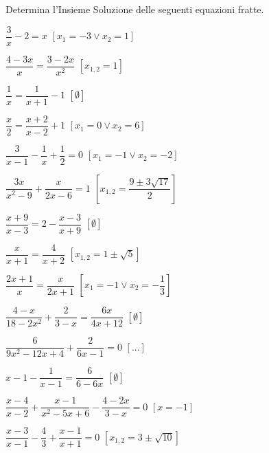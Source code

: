 
\begin{esercizio}[\Ast]
\label{ese:3.39}
Determina l'Insieme Soluzione delle seguenti equazioni fratte.
\begin{multicols}{2}
\begin{enumeratea}
\item\(\dfrac{3}{x}-2 = x\)
  \hfill\(\left[x_{1} =-3 \vee x_{2} = 1\right]\)
\item\(\dfrac{4-3 x}{x}=\dfrac{3-2 x}{x^{2}}\)
  \hfill\(\left[x_{1,2}= 1\right]\)
\item\(\dfrac{1}{x} = \dfrac{1}{x + 1}-1\)
  \hfill\(\left[\emptyset\right]\)
\item\(\dfrac{x}{2} = \dfrac{x + 2}{x-2} + 1\)
  \hfill\(\left[x_{1} = 0 \vee x_{2} = 6\right]\)
\item\(\dfrac{3}{x-1}-\dfrac{1}{x} + \dfrac{1}{2} = 0\)
  \hfill\(\left[x_{1} =-1 \vee x_{2} =-2\right]\)
\item\(\dfrac{3 x}{x^{2}-9} + \dfrac{x}{2 x-6}=1\)
  \hfill\(\left[x_{1,2} = \dfrac{9 \pm 3 \sqrt{17}}{2}\right]\)
\item\(\dfrac{x + 9}{x-3}=2-\dfrac{x-3}{x + 9}\)
  \hfill\(\left[\emptyset\right]\)
\item\(\dfrac{x}{x + 1} = \dfrac{4}{x + 2}\)
  \hfill\(\left[x_{1,2} = 1 \pm \sqrt{5}\right]\)
\item\(\dfrac{2 x + 1}{x} = \dfrac{x}{2 x + 1}\)
  \hfill\(\left[x_{1} =-1 \vee x_{2} =-\dfrac{1}{3}\right]\)
\item\(\dfrac{4-x}{18-2 x^{2}} + \dfrac{2}{3-x} = \dfrac{6 x}{4 x +12}\)
  \hfill\(\left[\emptyset\right]\)
\item\(\dfrac{6}{9 x^{2}-12 x + 4} + \dfrac{2}{6x -1} =0\)
  \hfill\(\left[...\right]\)
\item\(x-1-\dfrac{1}{x-1} = \dfrac{6}{6-6 x}\)
  \hfill\(\left[\emptyset\right]\)
\item\(\dfrac{x-4}{x-2} + \dfrac{x-1}{x^{2}-5 x + 6}-\dfrac{4 -2 x}{3-x} = 0\)
  \hfill\(\left[x =-1\right]\)
\item\(\dfrac{x-3}{x-1}-\dfrac{4}{3} + \dfrac{x-1}{x + 1}=0\)
  \hfill\(\left[x_{1,2} = 3 \pm \sqrt{10}\right]\)
\end{enumeratea}
\end{multicols}
\end{esercizio}

